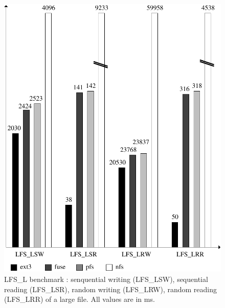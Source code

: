 \begin{figure}[ht]
\begin{center}
  \includegraphics [scale=0.55] {fig/lfs_l}
  \caption{\label{LfsL}
    {\small LFS\_L benchmark : senquential writing (LFS\_LSW),
      sequential reading (LFS\_LSR), random writing (LFS\_LRW), random
      reading (LFS\_LRR) of a large file. All values are in ms.}}
\end{center}
\end{figure}

